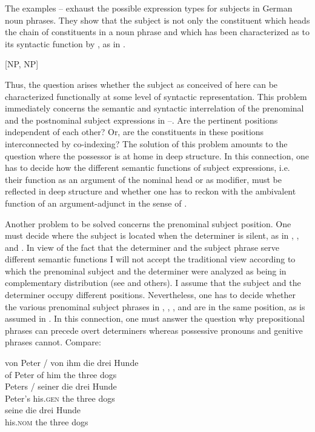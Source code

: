 \documentclass[output=paper,colorlinks,citecolor=brown]{langscibook}
\begin{document}
\noindent The examples -- exhaust the possible expression types for
subjects in German noun phrases. They show that the subject is not
only the constituent which heads the chain of constituents in a noun
phrase and which has been characterized as to its syntactic function
by , as in \citet{Chomsky65Aspects-of}.

\ea \label{ex:zi91:4} {[NP, NP]}
\z

\noindent Thus, the question arises whether the subject as conceived of here can be characterized functionally at some level of syntactic representation. This problem immediately concerns the semantic and syntactic interrelation of the prenominal and the postnominal subject expressions in --. Are the pertinent positions independent of each other? Or, are the constituents in these positions interconnected by co-indexing? The solution of this problem amounts to the question where the possessor is at home in deep structure. In this connection, one has to decide how the different semantic functions of subject expressions, i.e. their function as an argument of the nominal head or as modifier, must be reflected in deep structure and whether one has to reckon with the ambivalent function of an argument-adjunct in the sense of \citet{Grimshaw88Adjuncts-and}.

Another problem to be solved concerns the prenominal subject position. One must decide where the subject is located when the determiner is silent, as in , , and . In view of the fact that the determiner and the subject phrase serve different semantic functions I will not accept the traditional view according to which the prenominal subject and the determiner were analyzed as being in complementary distribution (see \citealt{Chomsky65Aspects-of} and others). I assume that the subject and the determiner occupy different positions. Nevertheless, one has to decide whether the various prenominal subject phrases in , , , and  are in the same position, as is assumed in \citet{Bhatt90Die-syntaktische}. In this connection, one must answer the question why prepositional phrases can precede overt determiners whereas possessive pronouns and genitive phrases cannot. Compare:

\begin{exe}
    \gll von Peter / von ihm die drei Hunde\\
   of Peter {} of him the three dogs\\
    
     \label{ex:zi91:1c} 
        \gll \minsp{*} Peters / seiner die drei Hunde\\
        {} Peter's {} his.\textsc{gen} the three dogs\\
        
     \label{ex:zi91:1d}
    \gll \minsp{*} seine die drei Hunde\\
    {} his.\textsc{nom} the three dogs\\
\end{exe}
\end{document}
